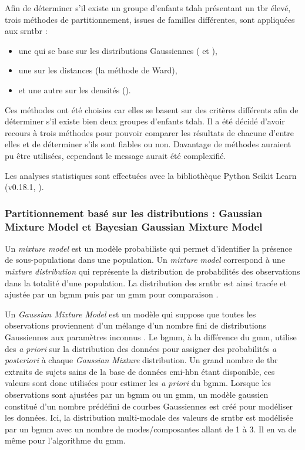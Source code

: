 Afin de déterminer s'il existe un groupe d'enfants \gls{tdah} présentant un \gls{tbr} élevé, trois méthodes de partitionnement, issues de familles différentes,
sont appliquées aux \gls{srntbr} : 
\begin{itemize}
\item une qui se base sur les distributions Gaussiennes ( et ), 
\item une sur les distances (la méthode de Ward),
\item et une autre sur les densités (). 
\end{itemize}

Ces méthodes ont été choisies car elles se basent sur des critères différents afin de déterminer s'il existe bien deux groupes d'enfants \gls{tdah}. Il a été décidé
d'avoir recours à trois méthodes pour pouvoir comparer les résultats de chacune d'entre elles et de déterminer s'ils sont fiables ou non. Davantage de méthodes auraient pu
être utilisées, cependant le message aurait été complexifié.   

Les analyses statistiques sont effectuées avec la bibliothèque Python Scikit Learn (v0.18.1, \citet{Pedregosa2011}).

\subsubsection{Partitionnement basé sur les distributions : Gaussian Mixture Model et Bayesian Gaussian Mixture Model} 
Un \textit{mixture model} est un modèle probabiliste qui permet d'identifier la présence de sous-populations dans une population. Un \textit{mixture model}
correspond à une \textit{mixture distribution} qui représente la distribution de probabilités des observations dans la totalité d'une population.
La distribution des \gls{srntbr} est ainsi tracée et ajustée par un \gls{bgmm} puis par un \gls{gmm} pour comparaison \citep{Attias2000, Blei2006}. 

Un \textit{Gaussian Mixture Model} est un modèle qui suppose que toutes les observations proviennent d'un mélange 
d'un nombre fini de distributions Gaussiennes aux paramètres inconnus \citep{Yu2016}. 
Le \gls{bgmm}, à la différence du \gls{gmm}, utilise des \textit{a priori} sur la distribution des données pour 
assigner des probabilités \textit{a posteriori} à chaque \textit{Gaussian Mixture} distribution. Un grand nombre de \gls{tbr} 
extraits de sujets sains de la base de données \gls{cmi-hbn} étant disponible, ces valeurs sont donc utilisées pour estimer les \textit{a priori} du \gls{bgmm}. 
Lorsque les observations sont ajustées par un \gls{bgmm} ou un \gls{gmm}, un modèle gaussien constitué d'un nombre prédéfini de courbes Gaussiennes est 
créé pour modéliser les données. Ici, la distribution multi-modale des valeurs de \gls{srntbr} est modélisée par un \gls{bgmm} avec un nombre 
de modes/composantes allant de 1 à 3. 
Il en va de même pour l'algorithme du \gls{gmm}. 


